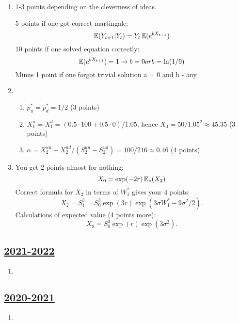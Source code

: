 \begin{enumerate}
\item
 1-3 points depending on the cleverness of ideas.
 
 5 points if one got correct martingale:
 \[
 \operatorname{\mathbb{E}}(Y_{t+1} | Y_t) = Y_t \operatorname{\mathbb{E}}(e^{b X_{t+1}})
 \]    
10 points if one solved equation correctly:
\[
\operatorname{\mathbb{E}}(e^{b X_{t+1}}) = 1 \rightarrow b = 0 or b = \ln(1/9)
\]
Minus 1 point if one forgot trivial solution a = 0 and b - any

\item \begin{enumerate}
    \item $p^*_u = p^*_d = 1/2$ (3 points)
    \item $X_1^u = X_1^d = (0.5\cdot 100 + 0.5\cdot 0) / 1.05$, hence $X_0 = 50/1.05^2 \approx 45.35$ (3 points)
    \item $\alpha = X_2^{uu} - X_2^{ud} / (S_2^{uu} - S_2^{ud}) = 100/216 \approx 0.46$ (4 points)
\end{enumerate}

\item 
You get 2 points almost for nothing:
\[
X_0 = \exp(-2r) \operatorname{\mathbb{E}}_{*}(X_2)    
\]
Correct formula for $X_2$ in terms of $W_1^*$ gives your 4 points:
\[
X_2 = S_1^3 = S_0^3 \exp(3r)\exp(3\sigma W_1^* - 9\sigma^2/2).    
\]
Calculations of expected value (4 points more):
\[
X_0 = S_0^3 \exp(r)\exp(3\sigma^2).    
\]

\end{enumerate}

\subsection[2021-2022]{\hyperref[sec:kr_02_2021_2022]{2021-2022}}
\label{sec:sol_kr_02_2021_2022} %



\begin{enumerate}

\item 


\end{enumerate}
    

\subsection[2020-2021]{\hyperref[sec:kr_02_2020_2021]{2020-2021}}
\label{sec:sol_kr_02_2020_2021} %



\begin{enumerate}
    
    
    
    \item
 
 
\end{enumerate}



